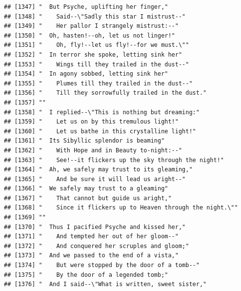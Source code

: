 \documentclass{article}\usepackage[]{graphicx}\usepackage[]{color}
\makeatletter
\newenvironment{kframe}{%
 \def\at@end@of@kframe{}%
 \ifinner\ifhmode%
  \def\at@end@of@kframe{\end{minipage}}%
  \begin{minipage}{\columnwidth}%
 \fi\fi%
 \def\FrameCommand##1{\hskip\@totalleftmargin \hskip-\fboxsep
 \colorbox{shadecolor}{##1}\hskip-\fboxsep
     \hskip-\linewidth \hskip-\@totalleftmargin \hskip\columnwidth}%
 \MakeFramed {\advance\hsize-\width
   \@totalleftmargin\z@ \linewidth\hsize
   \@setminipage}}%
 {\par\unskip\endMakeFramed%
 \at@end@of@kframe}
\newenvironment{knitrout}{}{} %
\makeatother
\begin{document}
\begin{knitrout}
\begin{kframe}
\begin{verbatim}
## [1347] "  But Psyche, uplifting her finger,"                                         
## [1348] "    Said--\"Sadly this star I mistrust--"                                    
## [1349] "    Her pallor I strangely mistrust:--"                                      
## [1350] "  Oh, hasten!--oh, let us not linger!"                                       
## [1351] "    Oh, fly!--let us fly!--for we must.\""                                   
## [1352] "  In terror she spoke, letting sink her"                                     
## [1353] "    Wings till they trailed in the dust--"                                   
## [1354] "  In agony sobbed, letting sink her"                                         
## [1355] "    Plumes till they trailed in the dust--"                                  
## [1356] "    Till they sorrowfully trailed in the dust."                              
## [1357] ""                                                                            
## [1358] "  I replied--\"This is nothing but dreaming:"                                
## [1359] "    Let us on by this tremulous light!"                                      
## [1360] "    Let us bathe in this crystalline light!"                                 
## [1361] "  Its Sibyllic splendor is beaming"                                          
## [1362] "    With Hope and in Beauty to-night:--"                                     
## [1363] "    See!--it flickers up the sky through the night!"                         
## [1364] "  Ah, we safely may trust to its gleaming,"                                  
## [1365] "    And be sure it will lead us aright--"                                    
## [1366] "  We safely may trust to a gleaming"                                         
## [1367] "    That cannot but guide us aright,"                                        
## [1368] "    Since it flickers up to Heaven through the night.\""                     
## [1369] ""                                                                            
## [1370] "  Thus I pacified Psyche and kissed her,"                                    
## [1371] "    And tempted her out of her gloom--"                                      
## [1372] "    And conquered her scruples and gloom;"                                   
## [1373] "  And we passed to the end of a vista,"                                      
## [1374] "    But were stopped by the door of a tomb--"                                
## [1375] "    By the door of a legended tomb;"                                         
## [1376] "  And I said--\"What is written, sweet sister,"                              

\end{verbatim}
\end{kframe}
\end{knitrout}
\end{document}
